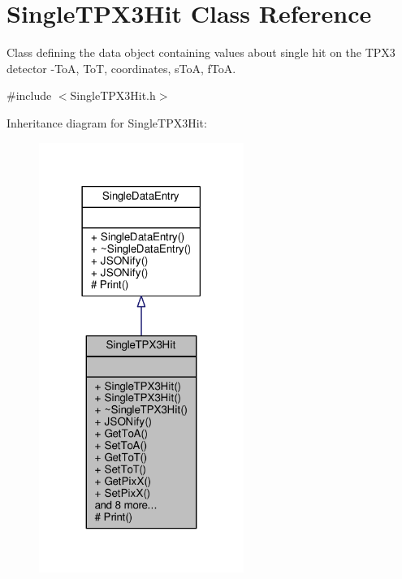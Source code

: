 \hypertarget{classSingleTPX3Hit}{\section{Single\+T\+P\+X3\+Hit Class Reference}
\label{classSingleTPX3Hit}
}


Class defining the data object containing values about single hit on the T\+P\+X3 detector -\/\+To\+A, To\+T, coordinates, s\+To\+A, f\+To\+A.  




{\ttfamily \#include $<$Single\+T\+P\+X3\+Hit.\+h$>$}



Inheritance diagram for Single\+T\+P\+X3\+Hit\+:\nopagebreak
\begin{figure}[H]
\begin{center}
\leavevmode
\includegraphics[width=189pt]{classSingleTPX3Hit__inherit__graph}
\end{center}
\end{figure}


